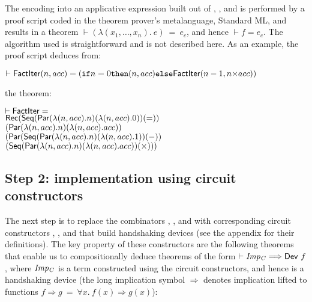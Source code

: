 \documentclass{llncs}
\begin{document}
The encoding into an applicative expression built out of ,
,  and  is performed by a proof script
coded in the theorem prover's metalanguage, Standard ML, and results
in a theorem $\vdash (\lambda(x_1,\ldots,x_n).~e)~=~e_c$, and hence
$\vdash f=e_c$.  The algorithm used is straightforward and is not
described here. As an example, the proof script deduces from:

\vspace*{-1mm}

\begin{alltt}
\( \vdash \DEF{FactIter}(n,acc) = (\texttt{if} n=0 \texttt{then} (n,acc) \texttt{else} \DEF{FactIter}(n-1,n{\times}acc)) \)
\end{alltt}

\vspace*{-1mm}

\noindent the theorem:

\vspace*{-1mm}

{\baselineskip10pt\begin{alltt}
\( \vdash \DEF{FactIter} =                                                                        \)
\(     \DEF{Rec} (\DEF{Seq} (\DEF{Par} ({\lambda}(n,acc). n) ({\lambda}(n,acc). 0)) ({=}))        \)
\(         (\DEF{Par} ({\lambda}(n,acc). n) ({\lambda}(n,acc). acc))                              \)
\(         (\DEF{Par} (\DEF{Seq} (\DEF{Par} ({\lambda}(n,acc). n) ({\lambda}(n,acc). 1)) ({-}))   \)
\(              (\DEF{Seq} (\DEF{Par} ({\lambda}(n,acc). n) ({\lambda}(n,acc). acc)) ({\times}))) \)
\end{alltt}}

\vspace*{-3mm}

\subsection*{Step 2: implementation using circuit constructors}

The next step is to replace the combinators ,
,  and  with corresponding circuit constructors
,
,  and  that build handshaking devices (see the appendix for their definitions).
The key property of these constructors are the following theorems that
enable us to compositionally deduce theorems of the form $\vdash
{\it{Imp_C}}
\Longrightarrow \mathsf{Dev}~f$, where ${\it{Imp_C}}$ is a term
constructed using  the circuit constructors, and hence is a handshaking device
(the long implication symbol $\Longrightarrow$ denotes
implication lifted to functions
$f \Longrightarrow g~=~\forall x.~f(x)\Rightarrow g(x)$): 
\end{document}
